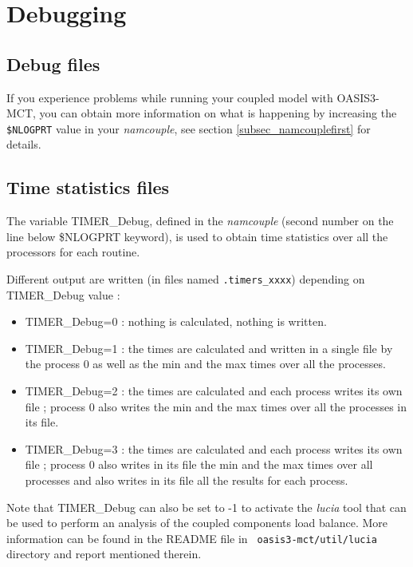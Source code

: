\section{Debugging}
\label{subsec_debug}

\subsection{Debug files}
If you experience problems while running your coupled model with
OASIS3-MCT, you can obtain more information on what is happening by
increasing the {\tt \$NLOGPRT} value in your {\it namcouple}, see section
\ref{subsec_namcouplefirst} for details.

\subsection{Time statistics files}
\label{timestat}

The variable TIMER\_Debug, defined in the {\it namcouple} (second
number on the line below \$NLOGPRT keyword), is used to obtain time
statistics over all the processors for each routine.

Different output are written (in files named {\tt *.timers\_xxxx})
depending on TIMER\_Debug value :

\begin{itemize}
\item {TIMER\_Debug=0} : nothing is calculated, nothing is written.
\item {TIMER\_Debug=1} : the times are calculated and written in a
  single file by the process 0 as well as the min and the max times
  over all the processes.
\item {TIMER\_Debug=2} : the times are calculated and each process
  writes its own file ; process 0 also writes the min and the max
  times over all the processes in its file.
\item {TIMER\_Debug=3} : the times are calculated and each process
  writes its own file ; process 0 also writes in its file the min
  and the max times over all processes and also writes in its file
  all the results for each process.
\end{itemize}

Note that TIMER\_Debug can also be set to -1 to activate the {\it lucia}
tool that can be used to perform an analysis of the coupled components
load balance. More information can be found in the README file in {\tt
  oasis3-mct/util/lucia} directory and report mentioned therein.
 
